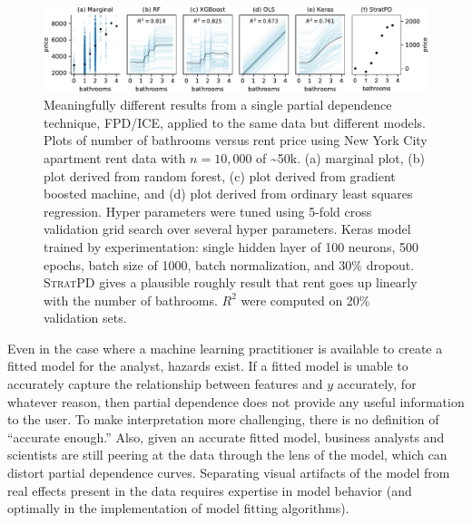 \documentclass[smallextended]{svjour3}       %
\newcommand{\spd}{\fontfamily{cmr}\textsc{\small StratPD}}
\begin{document}
\begin{figure}
\begin{center}
\includegraphics[scale=0.6]{images/bathrooms_vs_price.pdf}\vspace{-3mm}
\caption{\small Meaningfully different results from a single partial dependence technique, FPD/ICE, applied to the same data but different models. Plots of number of bathrooms versus rent price using New York City apartment rent data \citep{rent} with $n=10,000$ of \textasciitilde50k. (a) marginal plot, (b) plot derived from random forest, (c)  plot derived from gradient boosted machine, and (d) plot derived from ordinary least squares regression. Hyper parameters were tuned using 5-fold cross validation grid search over several hyper parameters. Keras model trained by experimentation: single hidden layer of 100 neurons, 500 epochs, batch size of 1000, batch normalization, and 30\% dropout. \spd{} gives a plausible roughly result that rent goes up linearly with the number of bathrooms. $R^2$ were computed on 20\% validation sets.\vspace{-7mm}}
\label{fig:baths_price}
\end{center}
\end{figure}

Even in the case where a machine learning practitioner is available to create a fitted model for the analyst, hazards exist. If a fitted model is unable to accurately capture the relationship between features and $y$ accurately, for whatever reason, then partial dependence does not provide any useful information to the user.  To make interpretation more challenging, there is no definition of ``accurate enough.'' Also, given an accurate fitted model, business analysts and scientists are still peering at the data through the lens of the model, which can distort partial dependence curves. Separating visual artifacts of the model from real effects present in the data requires expertise in model behavior (and optimally in the implementation of model fitting algorithms). 
\end{document}
